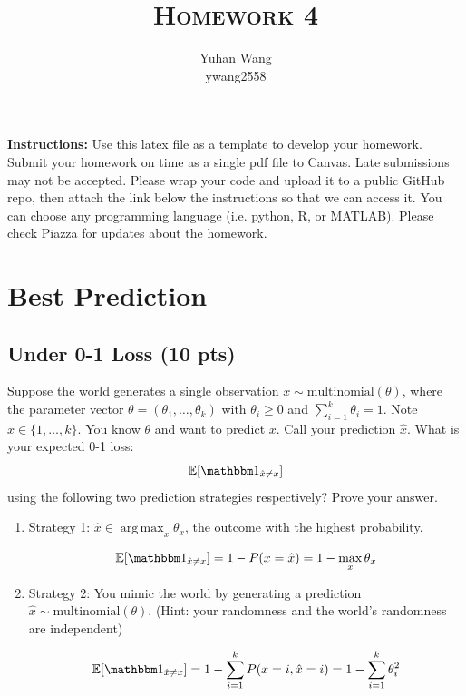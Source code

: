 \documentclass[10pt]{article}
\title{\textsc{Homework 4}} %
\author{
Yuhan Wang \\
ywang2558 \\
}
\date{}
\theoremstyle{definition}
\DeclareMathOperator*{\argmax}{arg\,max}
\def\E{\mathbb E}
\def\ind{\mathbbm 1}
\newenvironment{soln}{
    \leavevmode\color{blue}\ignorespaces
}{}
\begin{document}
\maketitle


\textbf{Instructions:} Use this latex file as a template to develop your homework. Submit your homework on time as a single pdf file to Canvas. Late submissions may not be accepted. Please wrap your code and upload it to a public GitHub repo, then attach the link below the instructions so that we can access it. You can choose any programming language (i.e. python, R, or MATLAB). Please check Piazza for updates about the homework.

\section{Best Prediction}
\subsection{Under 0-1 Loss (10 pts)}
Suppose the world generates a single observation $x \sim \mbox{multinomial}(\theta)$, where the parameter vector $\theta=(\theta_1, \ldots, \theta_k)$ with $\theta_i\ge 0$ and $\sum_{i=1}^k \theta_i=1$.  Note $x \in \{1, \ldots, k\}$.
You know $\theta$ and want to predict $x$.
Call your prediction $\hat x$.  What is your expected 0-1 loss:
$$\E[\ind_{\hat x \neq x}]$$
using the following two prediction strategies respectively?  Prove your answer.
\begin{enumerate}
    \item Strategy 1: $\hat x \in \argmax_x \theta_x$, the outcome with the highest probability.

          \begin{soln}
              $$\E[\ind_{\hat x \neq x}] = 1 - P(x = \hat x) = 1 - \max_x \theta_x$$
          \end{soln}

    \item Strategy 2: You mimic the world by generating a prediction $\hat x \sim \mbox{multinomial}(\theta)$.  (Hint: your randomness and the world's randomness are independent)

          \begin{soln}
              $$\E[\ind_{\hat x \neq x}] = 1 - \sum_{i=1}^{k} P(x = i, \hat x = i) = 1 - \sum_{i=1}^{k} \theta_i^2 $$
          \end{soln}

\end{enumerate}
\end{document}

